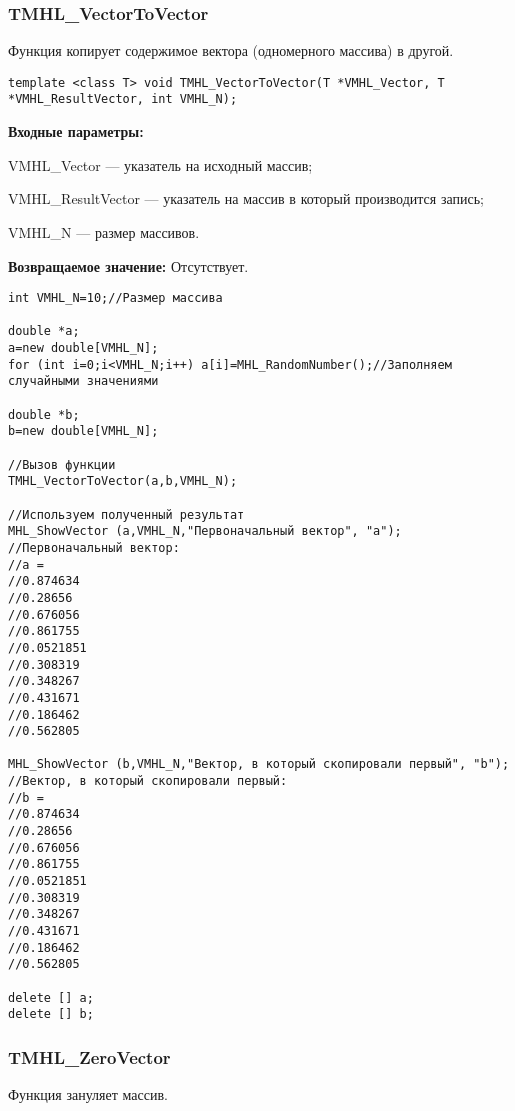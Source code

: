 \documentclass[a4paper,12pt]{article}
\begin{document}
\subsubsection{TMHL\_VectorToVector}\label{TMHL_VectorToVector}

Функция копирует содержимое вектора (одномерного массива) в другой.


\begin{lstlisting}[label=code_syntax_TMHL_VectorToVector,caption=Синтаксис]
template <class T> void TMHL_VectorToVector(T *VMHL_Vector, T *VMHL_ResultVector, int VMHL_N);
\end{lstlisting}

\textbf{Входные параметры:}

 VMHL\_Vector --- указатель на исходный массив;
 
 VMHL\_ResultVector --- указатель на массив в который производится запись;
 
 VMHL\_N --- размер массивов.

\textbf{Возвращаемое значение:}
Отсутствует.


\begin{lstlisting}[label=code_use_TMHL_VectorToVector,caption=Пример использования]
int VMHL_N=10;//Размер массива

double *a;
a=new double[VMHL_N];
for (int i=0;i<VMHL_N;i++) a[i]=MHL_RandomNumber();//Заполняем случайными значениями

double *b;
b=new double[VMHL_N];

//Вызов функции
TMHL_VectorToVector(a,b,VMHL_N);

//Используем полученный результат
MHL_ShowVector (a,VMHL_N,"Первоначальный вектор", "a");
//Первоначальный вектор:
//a =
//0.874634
//0.28656
//0.676056
//0.861755
//0.0521851
//0.308319
//0.348267
//0.431671
//0.186462
//0.562805

MHL_ShowVector (b,VMHL_N,"Вектор, в который скопировали первый", "b");
//Вектор, в который скопировали первый:
//b =
//0.874634
//0.28656
//0.676056
//0.861755
//0.0521851
//0.308319
//0.348267
//0.431671
//0.186462
//0.562805

delete [] a;
delete [] b;
\end{lstlisting}

\subsubsection{TMHL\_ZeroVector}\label{TMHL_ZeroVector}

Функция зануляет массив.
\end{document}
